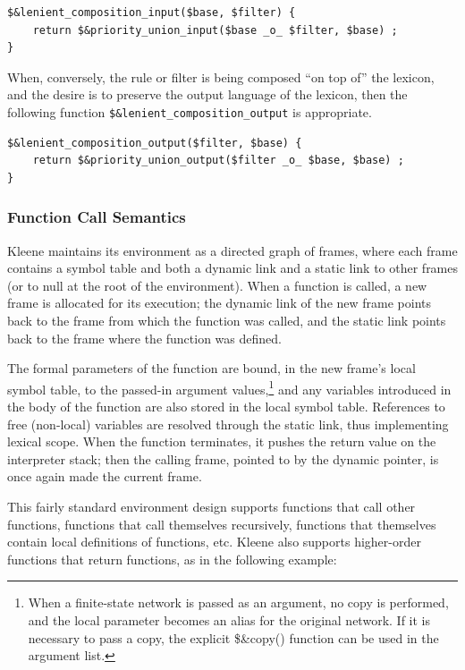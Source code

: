\documentclass[letterpaper,12pt]{article}
\newcommand{\Kleene}{Kleene\xspace}
\begin{document}
\begin{Verbatim}[fontsize=\small]
$&lenient_composition_input($base, $filter) {
    return $&priority_union_input($base _o_ $filter, $base) ;
}
\end{Verbatim}

\noindent
When, conversely, the rule or filter is being
composed ``on top of'' the lexicon, and the desire is to
preserve the output language of the lexicon, then the following
function \verb!$&lenient_composition_output! is appropriate.

\begin{Verbatim}[fontsize=\small]
$&lenient_composition_output($filter, $base) {
    return $&priority_union_output($filter _o_ $base, $base) ;
}
\end{Verbatim}



\subsubsection{Function Call Semantics}

\Kleene{} maintains its environment as a directed graph of frames,
where each frame
contains a symbol table and both a dynamic link and a static link to other frames (or to null at the root of the environment).  When a function is called, a new
frame is allocated for its execution; the dynamic link of the
new frame points back to the frame
from which the function was called, and the static link points back to the
frame where the function was defined.  

The formal parameters of the function are bound, in the new frame's local
symbol table, to the passed-in argument values,\footnote{When a finite-state
network is passed as an argument, no copy is performed, and the local
parameter becomes an alias for the original network.  If it is
necessary to pass a copy, the explicit \$\&copy() function can be used
in the argument list.}  and any variables introduced in
the body of the function are also stored in the local symbol
table.  References to free (non-local) variables are resolved
through the static link, thus implementing lexical scope.  When the
function terminates, it pushes the return value on the interpreter stack; then
the calling frame, pointed to by the dynamic
pointer, is once again made the current frame.

This fairly standard environment design supports functions that call other
functions, functions that call themselves recursively, functions
that themselves contain local definitions of functions, etc.  \Kleene{}
also supports higher-order functions that return functions,
as in the following example:
\end{document}
